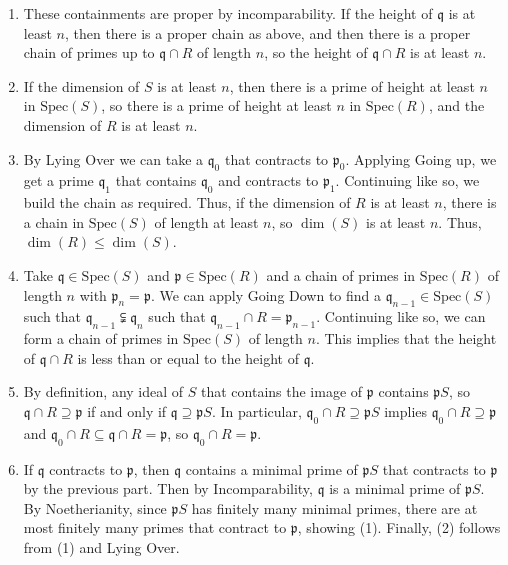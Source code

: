 \documentclass[12pt]{amsart}
\newcommand{\Bold}[1]{\contour{black}{#1}}
\newcommand{\p}{\mathfrak{p}}
\newcommand{\q}{\mathfrak{q}}
\newcommand{\Spec}{\mathrm{Spec}}
\renewcommand{\1}{\mathbbm{1}}
\newcommand{\solution}[1]{\ifthenelse {\equal{\displaysol}{1}} {\begin{framed}{\color{meretale}\noindent #1}\end{framed}} { \ }}
\newcommand\itema{\stepcounter{enumii}\item[{\Bold{(\theenumii)}}]}
\begin{document}
\begin{enumerate}
\solution{
\begin{enumerate}
\itema These containments are proper by incomparability. If the height of $\q$ is at least $n$, then there is a proper chain as above, and then there is a proper chain of primes up to $\q \cap R$ of length $n$, so the height of $\q \cap R$ is at least $n$.
\itema If the dimension of $S$ is at least $n$, then there is a prime of height at least $n$ in $\Spec(S)$, so there is a prime of height at least $n$ in $\Spec(R)$, and the dimension of $R$ is at least $n$.
\itema By Lying Over we can take a $\q_0$ that contracts to $\p_0$. Applying Going up, we get a prime $\q_1$ that contains $\q_0$ and contracts to $\p_1$. Continuing like so, we build the chain as required. Thus, if the dimension of $R$ is at least $n$, there is a chain in $\Spec(S)$ of length at least $n$, so $\dim(S)$ is at least $n$. Thus, $\dim(R)\leq \dim(S)$.
\itema Take $\q\in \Spec(S)$ and $\p\in \Spec(R)$ and a chain of primes in $\Spec(R)$ of length $n$ with $\p_n = \p$. We can apply Going Down to find a $\q_{n-1} \in \Spec(S)$ such that $\q_{n-1} \subsetneqq \q_{n}$  such that $\q_{n-1} \cap R = \p_{n-1}$. Continuing like so, we can form a chain of primes in $\Spec(S)$ of length $n$. This implies that the height of $\q \cap R$ is less than or equal to the height of $\q$.
\itema By definition, any ideal of $S$ that contains the image of $\p$ contains $\p S$, so $\q \cap R \supseteq \p$ if and only if $\q \supseteq \p S$. In particular, $\q_0 \cap R \supseteq \p S$ implies $\q_0 \cap R \supseteq \p$ and $\q_0 \cap R \subseteq \q \cap R =\p$, so $\q_0 \cap R = \p$.
\itema If $\q$ contracts to $\p$, then $\q$ contains a minimal prime of $\p S$ that contracts to $\p$ by the previous part. Then by Incomparability, $\q$ is a minimal prime of $\p S$. By Noetherianity, since $\p S$ has finitely many minimal primes, there are at most finitely many primes that contract to $\p$, showing (1). Finally, (2) follows from (1) and Lying Over.
\end{enumerate}
}





\end{enumerate}
\end{document}
